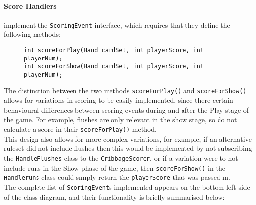 \documentclass{article}
\begin{document}
\paragraph{Score Handlers} implement the \verb|ScoringEvent| interface, which requires that they define the following methods:
\begin{figure}[H]
\centering
\begin{BVerbatim}
int scoreForPlay(Hand cardSet, int playerScore, int playerNum);
int scoreForShow(Hand cardSet, int playerScore, int playerNum);
\end{BVerbatim}
\end{figure}
\noindent The distinction between the two methods \verb|scoreForPlay()| and \verb|scoreForShow()| allows for variations in scoring to be easily implemented, since there certain behavioural differences between scoring events during and after the Play stage of the game. For example, flushes are only relevant in the show stage, so do not calculate a score in their \verb|scoreForPlay()| method.\\[2mm]
This design also allows for more complex variations, for example, if an alternative ruleset did not include flushes then this would be implemented by not subscribing the \verb|HandleFlushes| class to the \verb|CribbageScorer|, or if a variation were to not include runs in the Show phase of the game, then \verb|scoreForShow()| in the \verb|Handleruns| class could simply return the \verb|playerScore| that was passed in.\\[2mm]
The complete list of \verb|ScoringEvent|s implemented appears on the bottom left side of the class diagram, and their functionality is briefly summarised below:
\end{document}

